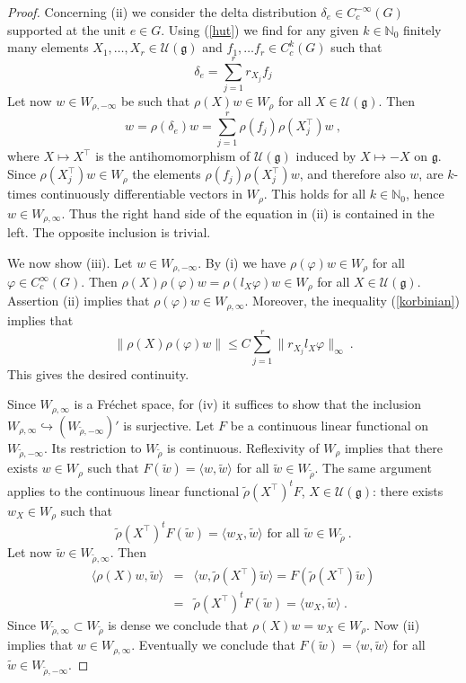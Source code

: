 \documentclass[10]{amsart}
\theoremstyle{remark}
\theoremstyle{definition}
\numberwithin{equation}{section}
\newcommand{\N}{\mathbb{N}}           %
\newcommand{\Hom}{\mathrm{Hom}}
\newcommand{\fg}{{\mathfrak g}}
\newcommand{\vp}{\varphi}
\newcommand{\Cal}{\mathcal}
\newcommand{\be}{\begin{equation}}
\begin{document}
{\begin{proof}
Concerning (ii) we consider the delta distribution $\delta_e\in C_c^{-\infty}(G)$ supported at the unit $e\in G$. Using (\ref{hut}) we find for any given $k\in\N_0$ finitely
many elements  $X_1,\dots,X_r\in {\Cal U}(\fg)$ and $f_1,\dots f_r\in C_c^k(G)$ such that
\be \label{rums}
\delta_e = \sum_{j=1}^{r} r_{X_j}f_j
\end{equation}
Let now $w\in W_{\rho,-\infty}$ be such that $\rho(X)w\in W_\rho$ for all $X\in {\Cal U}(\fg)$. Then
$$ w=\rho(\delta_e)w= \sum_{j=1}^{r}\rho(f_j)\rho(X_j^\top) w\ ,$$
where $X\mapsto X^\top$ is the antihomomorphism of  ${\Cal U}(\fg)$ induced by $X\mapsto -X$ on $\fg$. Since $\rho(X_j^\top) w\in W_\rho$ the
elements  $\rho(f_j)\rho(X_j^\top) w$, and therefore also $w$, are $k$-times continuously differentiable vectors in $W_\rho$. This holds for all $k\in\N_0$, hence $w\in W_{\rho,\infty}$.
Thus the right hand side of the equation in (ii) is contained in the left. The opposite inclusion is trivial.

We now show (iii). Let  $w\in W_{\rho,-\infty}$. By (i) we have $\rho(\vp)w\in W_{\rho}$ for all $\vp\in C_c^\infty(G)$.
Then $\rho(X)\rho(\vp)w=\rho(l_X\vp)w\in W_\rho$
for all $X\in  {\Cal U}(\fg)$. Assertion (ii) implies that $\rho(\vp)w\in W_{\rho,\infty}$.
Moreover, the inequality (\ref{korbinian}) implies that 
$$ \|\rho(X)\rho(\vp)w\|\le C \sum_{j=1}^{r}\| r_{X_j}l_X\vp\|_\infty\ .$$
This gives the desired continuity.

Since $W_{\rho,\infty}$ is a Fr\'echet space, for (iv) it suffices to show that the inclusion $W_{\rho,\infty}\hookrightarrow (W_{\tilde\rho,-\infty})'$ is surjective.
Let $F$ be a continuous linear functional on $W_{\tilde\rho,-\infty}$. Its restriction to $W_{\tilde\rho}$ is  continuous. Reflexivity of $W_\rho$ implies that there
exists $w\in W_\rho$ such that $F(\tilde w)=\langle w,\tilde w\rangle$ for all $\tilde w\in W_{\tilde\rho}$. The same argument applies to the continuous linear 
functional $\tilde\rho(X^\top)^t F$, $X\in  {\Cal U}(\fg)$:  there
exists $w_X\in W_\rho$ such that 
$$\tilde\rho(X^\top)^tF(\tilde w)=\langle w_X,\tilde w\rangle \mbox{ for all }\tilde w\in W_{\tilde\rho}\ .$$
Let now $\tilde w\in W_{\tilde \rho,\infty}$. Then
\begin{eqnarray*}
\langle \rho(X)w,\tilde w\rangle&=&\langle w,\tilde\rho(X^\top)\tilde w\rangle= F(\tilde\rho(X^\top)\tilde w)\\
&=& \tilde\rho(X^\top)^tF(\tilde w)=\langle w_X,\tilde w\rangle\ .
\end{eqnarray*}
Since $W_{\tilde \rho,\infty}\subset W_{\tilde \rho}$ is dense we conclude that $\rho(X)w=w_X\in W_\rho$. Now (ii) implies that $w\in W_{\rho,\infty}$.
Eventually we conclude that $F(\tilde w)=\langle w,\tilde w\rangle$ for all $\tilde w\in W_{\tilde\rho,-\infty}$.
%
\end{proof}

}
\end{document}
